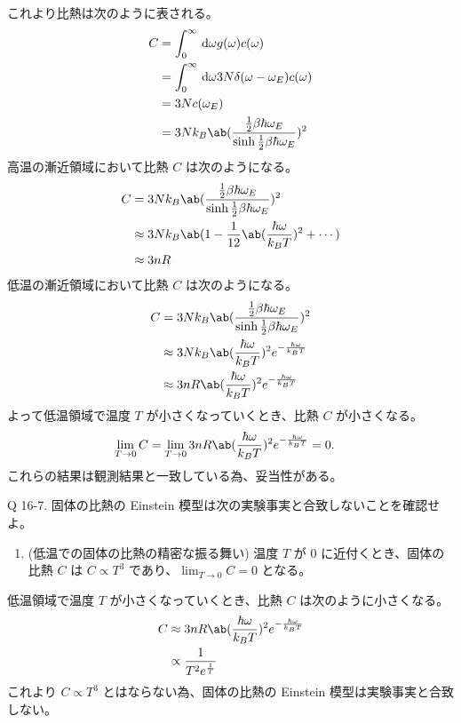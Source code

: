 \documentclass[uplatex,diffipdfmx,a4paper,11pt]{jlreq}
\theoremstyle{definition}
\begin{document}
これより比熱は次のように表される。
\begin{align}
  C & = \int_0^\infty\dl{\omega}g(\omega)c(\omega)                                           \\
    & = \int_0^\infty\dl{\omega}3N\delta(\omega - \omega_E)c(\omega)                         \\
    & = 3Nc(\omega_E)                                                                        \\
    & = 3Nk_B\ab(\frac{\frac{1}{2}\beta\hbar\omega_E}{\sinh\frac{1}{2}\beta\hbar\omega_E})^2
\end{align}
高温の漸近領域において比熱 $C$ は次のようになる。
\begin{align}
  C & = 3Nk_B\ab(\frac{\frac{1}{2}\beta\hbar\omega_E}{\sinh\frac{1}{2}\beta\hbar\omega_E})^2 \\
    & \approx 3Nk_B\ab(1 - \frac{1}{12}\ab(\frac{\hbar\omega}{k_BT})^2 + \cdots)             \\
    & \approx 3nR
\end{align}
低温の漸近領域において比熱 $C$ は次のようになる。
\begin{align}
  C & = 3Nk_B\ab(\frac{\frac{1}{2}\beta\hbar\omega_E}{\sinh\frac{1}{2}\beta\hbar\omega_E})^2 \\
    & \approx 3Nk_B\ab(\frac{\hbar\omega}{k_BT})^2e^{-\frac{\hbar\omega}{k_BT}}              \\
    & \approx 3nR\ab(\frac{\hbar\omega}{k_BT})^2e^{-\frac{\hbar\omega}{k_BT}}
\end{align}
よって低温領域で温度 $T$ が小さくなっていくとき、比熱 $C$ が小さくなる。
\begin{align}
  \lim_{T\to 0} C & = \lim_{T\to 0}3nR\ab(\frac{\hbar\omega}{k_BT})^2e^{-\frac{\hbar\omega}{k_BT}} = 0.
\end{align}
これらの結果は観測結果と一致している為、妥当性がある。

\begin{itembox}[l]{Q 16-7.}
  固体の比熱の Einstein 模型は次の実験事実と合致しないことを確認せよ。
  \begin{enumerate}
    \item (低温での固体の比熱の精密な振る舞い) 温度 $T$ が $0$ に近付くとき、固体の比熱 $C$ は $C \propto T^3$ であり、$\lim_{T\to 0} C = 0$ となる。
  \end{enumerate}
\end{itembox}
低温領域で温度 $T$ が小さくなっていくとき、比熱 $C$ は次のように小さくなる。
\begin{align}
  C & \approx 3nR\ab(\frac{\hbar\omega}{k_BT})^2e^{-\frac{\hbar\omega}{k_BT}} \\
    & \propto \frac{1}{T^{2}e^{\frac{1}{T}}}
\end{align}
これより $C \propto T^3$ とはならない為、固体の比熱の Einstein 模型は実験事実と合致しない。
\end{document}
